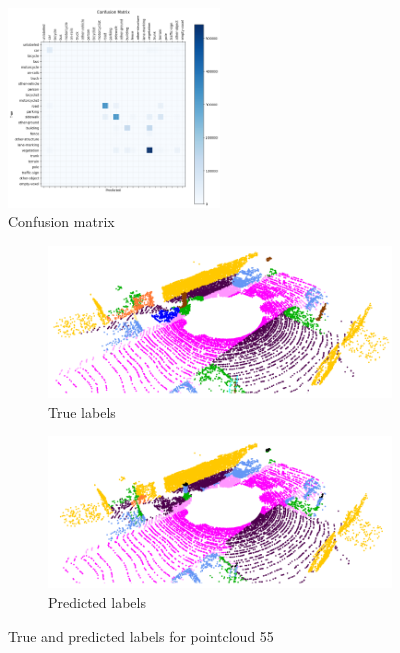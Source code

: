 \begin{figure}[ht]
    \centering
    \includegraphics[width=0.5\textwidth]{images/confusion_matrix.png}
    \caption{Confusion matrix}
    \label{fig:matrix}
\end{figure}

\begin{figure}[ht]
    \centering
    \begin{subfigure}[b]{0.45\textwidth}
        \centering
        \includegraphics[width=\textwidth]{images/true.png}
        \caption{True labels}
        \label{fig:true}
    \end{subfigure}
    \hfill
    \begin{subfigure}[b]{0.45\textwidth}
        \centering
        \includegraphics[width=\textwidth]{images/pred.png}
        \caption{Predicted labels}
        \label{fig:pred}
    \end{subfigure}
    \caption{True and predicted labels for pointcloud 55}
    \label{fig:visual}
\end{figure}

